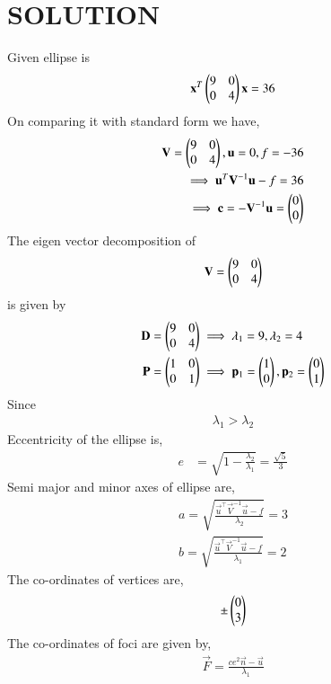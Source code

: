 \documentclass[journal,12pt,twocolumn]{IEEEtran}
\begin{document}
\section{SOLUTION}
%
Given ellipse is
\begin{align}
   \mathbf{x}^T\begin{pmatrix}9&0\\0&4\end{pmatrix}\mathbf{x}=36
\end{align}
%
On comparing it with standard form we have,
\begin{align}
    \mathbf{V}=\begin{pmatrix}9&0\\0&4\end{pmatrix},\mathbf{u}=0,f=-36\\
    \implies\mathbf{u}^T\mathbf{V}^{-1}\mathbf{u}-f = 36\\
    \implies\mathbf{c} = -\mathbf{V}^{-1}\mathbf{u} = \begin{pmatrix}0\\0\end{pmatrix}\\
\end{align}
The eigen vector decomposition of 
\begin{align}
    \mathbf{V} = \begin{pmatrix}9&0\\0&4\end{pmatrix}
\end{align}
is given by
\begin{align}
    \mathbf{D} &= \begin{pmatrix}9&0\\0&4\end{pmatrix} \implies \lambda_1 = 9,\lambda_2 = 4\\
    \mathbf{P} &= \begin{pmatrix}1&0\\0&1\end{pmatrix}\implies \mathbf{p}_1 = \begin{pmatrix}1\\0\end{pmatrix}, \mathbf{p}_2 = \begin{pmatrix}0\\1\end{pmatrix}
\end{align}
Since
\begin{align}
   \lambda_1 > \lambda_2
\end{align}
Eccentricity of the ellipse is,
\begin{align}
   e &= \sqrt{1-\frac{\lambda_2}{\lambda_1}}
   = \frac{\sqrt{5}}{3}
\end{align} 
Semi major and minor axes of ellipse are,
\begin{align}
    a = \sqrt{\frac{\vec{u}^{\top}\vec{V}^{-1}\vec{u}-f}{\lambda_2}} = 3\\ 
    b = \sqrt{\frac{\vec{u}^{\top}\vec{V}^{-1}\vec{u}-f}{\lambda_1}} = 2
\end{align}
The co-ordinates of vertices are,
\begin{align}
   \pm\begin{pmatrix}0 \\ 3\end{pmatrix} 
\end{align}
The co-ordinates of foci are given by,
\begin{align}
  \vec{F}  = \frac{ce^2\vec{n}-\vec{u}}{\lambda_1}
\end{align}
\end{document}
